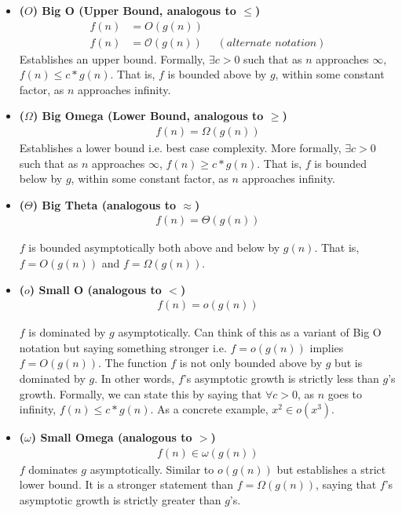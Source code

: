 \documentclass[10pt,a4paper]{article}
\begin{document}
\begin{itemize}
    \item \textbf{($O$) Big O (Upper Bound, analogous to $\leq$)} 
    \begin{align*}
        f(n) &= O(g(n)) \\
        f(n) &= \mathcal{O}(g(n)) \, \, \quad (\textit{alternate notation})
    \end{align*}   
    Establishes an upper bound. Formally, $\exists c > 0$ such that as $n$ approaches $\infty$, $f(n) \leq c*g(n)$. That is, $f$ is bounded above by $g$, within some constant factor, as $n$ approaches infinity.

    \item \textbf{($\Omega$) Big Omega (Lower Bound, analogous to $\geq$)}
    \begin{align*}
        f(n) = \Omega(g(n))
    \end{align*}
    Establishes a lower bound i.e. best case complexity. More formally, $\exists c > 0$ such that as $n$ approaches $\infty$, $f(n) \geq c*g(n)$. That is, $f$ is bounded below by $g$, within some constant factor, as $n$ approaches infinity.

    \item \textbf{($\Theta$) Big Theta (analogous to $\approx$)} 
    \begin{align*}
        f(n) = \Theta(g(n))
    \end{align*}

    $f$ is bounded asymptotically both above and below by $g(n)$. That is, $f = O(g(n))$ and $f = \Omega(g(n))$.

    \item \textbf{($o$) Small O (analogous to $<$)}
    \begin{align*}
        f(n) = o(g(n))
    \end{align*}
    
    $f$ is dominated by $g$ asymptotically. Can think of this as a variant of Big O notation but saying something stronger i.e. $f = o(g(n))$ implies $f = O(g(n))$. The function $f$ is not only bounded above by $g$ but is dominated by $g$. In other words, $f$'s asymptotic growth is strictly less than $g$'s growth. Formally, we can state this by saying that $\forall c > 0$, as $n$ goes to infinity, $f(n) \leq c*g(n)$. As a concrete example, $x^2 \in o(x^3)$.

    \item \textbf{($\omega$) Small Omega (analogous to $>$)} 
    \begin{align*}
        f(n) \in \omega(g(n))
    \end{align*}
    $f$ dominates $g$ asymptotically. Similar to $o(g(n))$ but establishes a strict lower bound. It is a stronger statement than $f = \Omega(g(n))$, saying that $f$'s asymptotic growth is strictly greater than $g$'s.
\end{itemize}
\end{document}
